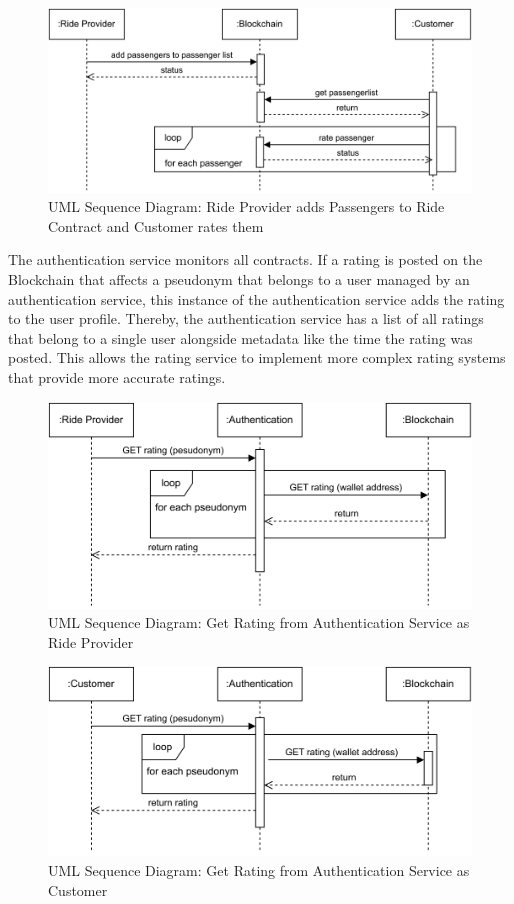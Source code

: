 \begin{figure}[h]
    \centering
    \includegraphics[width=\linewidth]{data/8.svg}
    \caption{UML Sequence Diagram: Ride Provider adds Passengers to Ride Contract and Customer rates them}
    \label{fig:directSVG}
\end{figure}


The authentication service monitors all contracts. If a rating is posted on the Blockchain that affects a pseudonym that belongs to a user managed by an authentication service, this instance of the authentication service adds the rating to the user profile. Thereby, the authentication service has a list of all ratings that belong to a single user alongside metadata like the time the rating was posted. This allows the rating service to implement more complex rating systems that provide more accurate ratings.

\begin{figure}[h]
    \centering
    \includegraphics[width=\linewidth]{data/7.svg}
    \caption{UML Sequence Diagram: Get Rating from Authentication Service as Ride Provider}
    \label{fig:directSVG}
\end{figure}

\begin{figure}[h]
    \centering
    \includegraphics[width=\linewidth]{data/9.svg}
    \caption{UML Sequence Diagram: Get Rating from Authentication Service as Customer}
    \label{fig:directSVG}
\end{figure}


